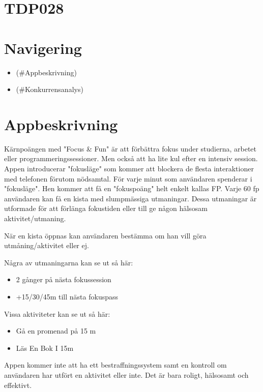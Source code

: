\documentclass[11pt]{article}
\author{Nadim}
\date{\today}
\title{}
\begin{document}
\tableofcontents

\section{TDP028}
\label{sec:orgb3b8bf9}

\section{Navigering}
\label{sec:orgb021ef4}
\begin{itemize}
\item\relax [Appbeskrivning](\#Appbeskrivning)
\item\relax [Konkurrensanalys](\#Konkurrensanalys)
\end{itemize}

\section{Appbeskrivning}
\label{sec:org923a981}

Kärnpoängen med "Focus \& Fun" är att förbättra fokus under studierna,
arbetet eller programmeringssessioner. Men också att ha lite kul efter
en intensiv session. Appen introducerar "fokusläge" som kommer att
blockera de flesta interaktioner med telefonen förutom nödsamtal. För
varje minut som användaren spenderar i "fokusläge". Hen kommer att få
en "fokuspoäng" helt enkelt kallas FP. Varje 60 fp användaren kan få
en kista med slumpmässiga utmaningar. Dessa utmaningar är utformade
för att förlänga fokustiden eller till ge någon hälsosam
aktivitet/utmaning.

När en kista öppnas kan användaren bestämma om han vill göra
utmåning/aktivitet eller ej.

Några av utmaningarna kan se ut så här:
\begin{itemize}
\item 2 gånger på nästa fokussession
\item +15/30/45m till nästa fokuspass
\end{itemize}

Vissa aktiviteter kan se ut så här:

\begin{itemize}
\item Gå en promenad på 15 m
\item Läs En Bok I 15m
\end{itemize}

Appen kommer inte att ha ett bestraffningssystem samt en kontroll om
användaren har utfört en aktivitet eller inte. Det är bara roligt,
hälsosamt och effektivt.
\end{document}

